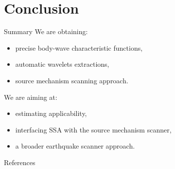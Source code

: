 \documentclass[10pt]{beamer}
\begin{document}
\section{Conclusion}

\begin{frame}{Summary}
  We are obtaining:
  \begin{itemize}
    \item precise body-wave characteristic functions,
    \item automatic wavelets extractions,
    \item source mechanism scanning approach.
  \end{itemize}

  We are aiming at:
  \begin{itemize}
    \item estimating applicability,
    \item interfacing SSA with the source mechanism scanner,
    \item a broader earthquake scanner approach.
  \end{itemize}

\end{frame}


\begin{frame}[allowframebreaks]{References}

  
  

\end{frame}
\end{document}
